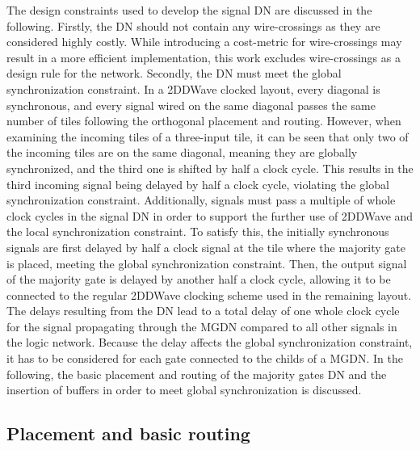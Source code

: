 The design constraints used to develop the signal DN are discussed in the following. Firstly, the DN should not contain any wire-crossings as they are considered highly costly. While introducing a cost-metric for wire-crossings may result in a more efficient implementation, this work excludes wire-crossings as a design rule for the network. Secondly, the DN must meet the global synchronization constraint. In a 2DDWave clocked layout, every diagonal is synchronous, and every signal wired on the same diagonal passes the same number of tiles following the orthogonal placement and routing. However, when examining the incoming tiles of a three-input tile, it can be seen that only two of the incoming tiles are on the same diagonal, meaning they are globally synchronized, and the third one is shifted by half a clock cycle. This results in the third incoming signal being delayed by half a clock cycle, violating the global synchronization constraint. Additionally, signals must pass a multiple of whole clock cycles in the signal DN in order to support the further use of 2DDWave and the local synchronization constraint. To satisfy this, the initially synchronous signals are first delayed by half a clock signal at the tile where the majority gate is placed, meeting the global synchronization constraint. Then, the output signal of the majority gate is delayed by another half a clock cycle, allowing it to be connected to the regular 2DDWave clocking scheme used in the remaining layout. The delays resulting from the DN lead to a total delay of one whole clock cycle for the signal propagating through the MGDN compared to all other signals in the logic network. Because the delay affects the global synchronization constraint, it has to be considered for each gate connected to the childs of a MGDN. In the following, the basic placement and routing of the majority gates DN and the insertion of buffers in order to meet global synchronization is discussed.

\subsection{Placement and basic routing}

